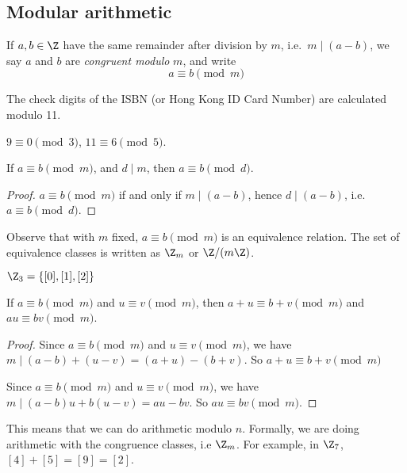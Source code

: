 \documentclass[a4paper]{article}
\begin{document}
\subsection{Modular arithmetic}
\begin{defi}[Modulo]
  If $a, b\in \Z$ have the same remainder after division by $m$, i.e.\ $m \mid (a - b)$, we say $a$ and $b$ are \emph{congruent modulo} $m$, and write
  \[
    a\equiv b\pmod m
  \]
\end{defi}

\begin{eg}
  The check digits of the ISBN (or Hong Kong ID Card Number) are calculated modulo 11.
\end{eg}

\begin{eg}
  $9 \equiv 0\pmod 3$, $11\equiv 6\pmod 5$.
\end{eg}

\begin{prop}
  If $a\equiv b\pmod m$, and $d \mid m$, then $a \equiv b\pmod d$.
\end{prop}

\begin{proof}
  $a\equiv b\pmod m$ if and only if $m \mid (a - b)$, hence $d \mid (a - b)$, i.e.\ $a \equiv b\pmod d$.
\end{proof}

Observe that with $m$ fixed, $a\equiv b\pmod m$ is an equivalence relation. The set of equivalence classes is written as $\Z_m$ or $\Z/(m\Z)$.

\begin{eg}
  $\Z_3 = \{[0], [1], [2]\}$
\end{eg}

\begin{prop}
  If $a\equiv b\pmod m$ and $u\equiv v \pmod m$, then $a + u\equiv b + v\pmod m$ and $au \equiv bv \pmod m$.
\end{prop}

\begin{proof}
  Since $a\equiv b\pmod m$ and $u\equiv v \pmod m$, we have $m \mid (a - b) + (u - v) = (a + u) - (b + v)$. So $a + u\equiv b + v\pmod m$

  Since $a\equiv b\pmod m$ and $u\equiv v \pmod m$, we have $m \mid (a - b)u + b(u - v) = au - bv$. So $au \equiv bv \pmod m$.
\end{proof}

This means that we can do arithmetic modulo $n$. Formally, we are doing arithmetic with the congruence classes, i.e $\Z_m$. For example, in $\Z_7$, $[4] + [5] = [9] = [2]$.
\end{document}
